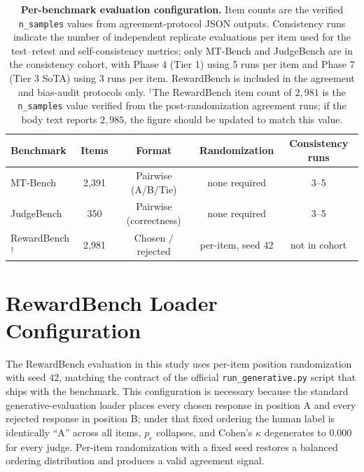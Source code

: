 \begin{table}[!t]
\centering
\small
\begin{tabular}{lcccc}
\toprule
\textbf{Benchmark} & \textbf{Items} & \textbf{Format} & \textbf{Randomization} & \textbf{Consistency runs} \\
\midrule
MT-Bench    & 2{,}391 & Pairwise (A/B/Tie) & none required & 3--5 \\
JudgeBench  & 350     & Pairwise (correctness) & none required & 3--5 \\
RewardBench$^{\dagger}$
            & 2{,}981 & Chosen / rejected & per-item, seed 42 & not in cohort \\
\bottomrule
\end{tabular}
\caption{\textbf{Per-benchmark evaluation configuration.} Item counts
are the verified \texttt{n\_samples} values from agreement-protocol
JSON outputs. Consistency runs indicate the number of independent
replicate evaluations per item used for the test--retest and
self-consistency metrics; only MT-Bench and JudgeBench are in the
consistency cohort, with Phase 4 (Tier 1) using 5 runs per item and
Phase 7 (Tier 3 SoTA) using 3 runs per item. RewardBench is included
in the agreement and bias-audit protocols only.
$^{\dagger}$The RewardBench item count of $2{,}981$ is the
\texttt{n\_samples} value verified from the post-randomization
agreement runs; if the body text reports $2{,}985$, the figure
should be updated to match this value.}
\label{tab:appendix-benchmark-config}
\end{table}


\clearpage
\section{RewardBench Loader Configuration}
\label{app:rewardbench-loader}

The RewardBench evaluation in this study uses per-item position
randomization with seed $42$, matching the contract of the official
\texttt{run\_generative.py} script that ships with the benchmark.
This configuration is necessary because the standard
generative-evaluation loader places every chosen response in
position A and every rejected response in position B; under that
fixed ordering the human label is identically ``A'' across all
items, $p_e$ collapses, and Cohen's $\kappa$ degenerates to $0.000$
for every judge. Per-item randomization with a fixed seed restores a
balanced ordering distribution and produces a valid agreement signal.


